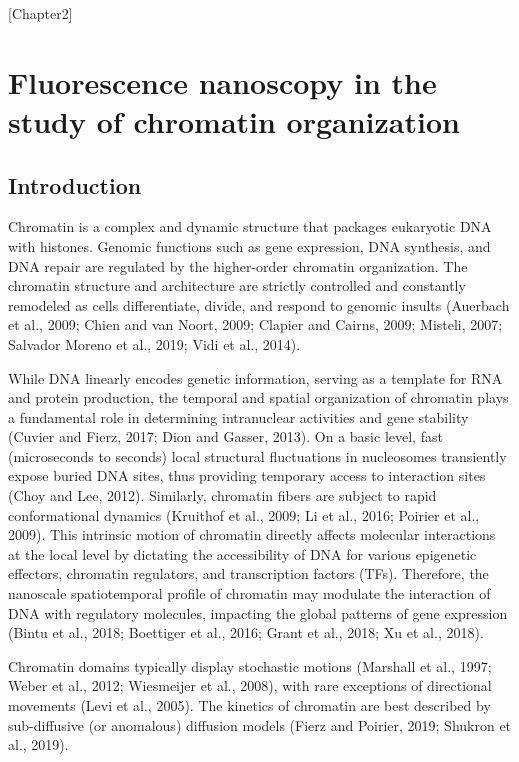 [Chapter2]

\chapter{Fluorescence nanoscopy in the study of chromatin organization}

\section{Introduction}

Chromatin is a complex and dynamic structure that packages eukaryotic DNA with histones. Genomic functions such as gene expression, DNA synthesis, and DNA repair are regulated by the higher-order chromatin organization. The chromatin structure and architecture are strictly controlled and constantly remodeled as cells differentiate, divide, and respond to genomic insults (Auerbach et al., 2009; Chien and van Noort, 2009; Clapier and Cairns, 2009; Misteli, 2007; Salvador Moreno et al., 2019; Vidi et al., 2014).

While DNA linearly encodes genetic information, serving as a template for RNA and protein production, the temporal and spatial organization of chromatin plays a fundamental role in determining intranuclear activities and gene stability (Cuvier and Fierz, 2017; Dion and Gasser, 2013). On a basic level, fast (microseconds to seconds) local structural fluctuations in nucleosomes transiently expose buried DNA sites, thus providing temporary access to interaction sites (Choy and Lee, 2012). Similarly, chromatin fibers are subject to rapid conformational dynamics (Kruithof et al., 2009; Li et al., 2016; Poirier et al., 2009). This intrinsic motion of chromatin directly affects molecular interactions at the local level by dictating the accessibility of DNA for various epigenetic effectors, chromatin regulators, and transcription factors (TFs). Therefore, the nanoscale spatiotemporal profile of chromatin may modulate the interaction of DNA with regulatory molecules, impacting the global patterns of gene expression (Bintu et al., 2018; Boettiger et al., 2016; Grant et al., 2018; Xu et al., 2018).

Chromatin domains typically display stochastic motions (Marshall et al., 1997; Weber et al., 2012; Wiesmeijer et al., 2008), with rare exceptions of directional movements (Levi et al., 2005). The kinetics of chromatin are best described by sub-diffusive (or anomalous) diffusion models (Fierz and Poirier, 2019; Shukron et al., 2019).

